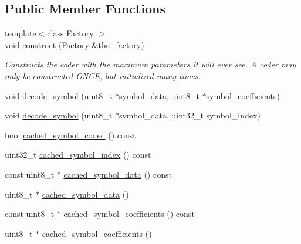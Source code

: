 \subsection*{Public Member Functions}
\begin{DoxyCompactItemize}
\item 
{\footnotesize template$<$class Factory $>$ }\\void \hyperlink{classkodo_1_1cached__symbol__decoder_a5f95aa8312d676295a90c6bb15e3d89c}{construct} (Factory \&the\-\_\-factory)
\begin{DoxyCompactList}\small\item\em Constructs the coder with the maximum parameters it will ever see. A coder may only be constructed O\-N\-C\-E, but initialized many times. \end{DoxyCompactList}\item 
void \hyperlink{classkodo_1_1cached__symbol__decoder_a0058a730b43e171b0c00f86f4c7ba67f}{decode\-\_\-symbol} (uint8\-\_\-t $\ast$symbol\-\_\-data, uint8\-\_\-t $\ast$symbol\-\_\-coefficients)
\begin{DoxyCompactList}\small\item\em \end{DoxyCompactList}\item 
void \hyperlink{classkodo_1_1cached__symbol__decoder_a1306f392bb9eb529a06fe8202fc1bd2a}{decode\-\_\-symbol} (uint8\-\_\-t $\ast$symbol\-\_\-data, uint32\-\_\-t symbol\-\_\-index)
\begin{DoxyCompactList}\small\item\em \end{DoxyCompactList}\item 
bool \hyperlink{classkodo_1_1cached__symbol__decoder_a14d17e45749ec18c37e61196b4920d45}{cached\-\_\-symbol\-\_\-coded} () const 
\item 
uint32\-\_\-t \hyperlink{classkodo_1_1cached__symbol__decoder_ab79bad65788c8764a5c568eb14d72966}{cached\-\_\-symbol\-\_\-index} () const 
\item 
const uint8\-\_\-t $\ast$ \hyperlink{classkodo_1_1cached__symbol__decoder_a7a43f84f472397b82a06e8f02a7c7fdd}{cached\-\_\-symbol\-\_\-data} () const 
\item 
uint8\-\_\-t $\ast$ \hyperlink{classkodo_1_1cached__symbol__decoder_a5c018f1afa64f7dee256d5a60b47b63a}{cached\-\_\-symbol\-\_\-data} ()
\begin{DoxyCompactList}\small\item\em \end{DoxyCompactList}\item 
const uint8\-\_\-t $\ast$ \hyperlink{classkodo_1_1cached__symbol__decoder_ad572b4c137e1f320ba9cb00d78325506}{cached\-\_\-symbol\-\_\-coefficients} () const 
\item 
uint8\-\_\-t $\ast$ \hyperlink{classkodo_1_1cached__symbol__decoder_ac20f22857eaf7833d1a362c9db24128d}{cached\-\_\-symbol\-\_\-coefficients} ()
\begin{DoxyCompactList}\small\item\em \end{DoxyCompactList}\end{DoxyCompactItemize}


